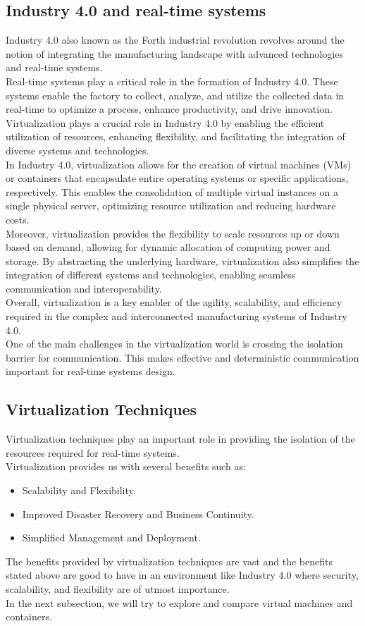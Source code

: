 \documentclass[a4paper, 11pt, twocolumn]{article}
\theoremstyle{nonumberplain}
\begin{document}
\subsection{Industry 4.0 and real-time systems}
Industry 4.0 also known as the Forth industrial revolution revolves around
the notion of integrating the manufacturing landscape with advanced
technologies and real-time systems. \\
Real-time systems play a critical role in the formation of Industry 4.0.
These systems enable the factory to collect, analyze, and utilize the collected
data in real-time to optimize a process, enhance productivity, and drive
innovation. \\
Virtualization plays a crucial role in Industry 4.0 by enabling the efficient
utilization of resources, enhancing flexibility, and facilitating the
integration of diverse systems and technologies. \\
In Industry 4.0, virtualization allows for the creation of virtual machines
(VMs) or containers that encapsulate entire operating systems or specific
applications, respectively. This enables the consolidation of multiple
virtual instances on a single physical server, optimizing resource
utilization and reducing hardware costs. \\
Moreover, virtualization provides the flexibility to scale resources up or
down based on demand, allowing for dynamic allocation of computing power and
storage. By abstracting the underlying hardware, virtualization also
simplifies the integration of different systems and technologies,
enabling seamless communication and interoperability. \\
Overall, virtualization is a key enabler of the agility, scalability,
and efficiency required in the complex and interconnected
manufacturing systems of Industry 4.0. \\
One of the main challenges in the virtualization world is crossing the
isolation barrier for communication. This makes effective and deterministic
communication important for real-time systems design.
\subsection{Virtualization Techniques}
Virtualization techniques play an important role in providing the isolation
of the resources required for real-time systems. \\
Virtualization provides us with several benefits such as:
\begin{itemize}
    \item Scalability and Flexibility.
    \item Improved Disaster Recovery and Business Continuity.
    \item Simplified Management and Deployment.
\end{itemize}
The benefits provided by virtualization techniques are vast and the benefits stated
above are good to have in an environment like Industry 4.0 where security,
scalability, and flexibility are of utmost importance. \\
In the next subsection, we will try to explore and compare virtual machines and
containers.
\end{document}
